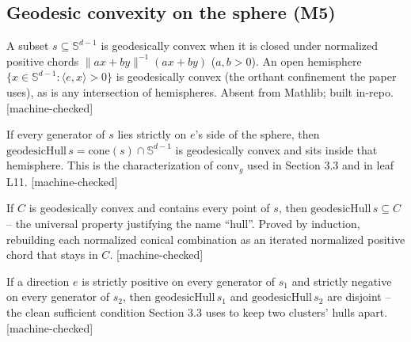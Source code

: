 \subsection{Geodesic convexity on the sphere (M5)}

\begin{lemma}\label{found:gconvex}\leanok
A subset $s \subseteq \mathbb S^{d-1}$ is geodesically convex when it is closed under normalized
positive chords $\|a x + b y\|^{-1}(a x + b y)$ ($a,b>0$). An open hemisphere
$\{x \in \mathbb S^{d-1} : \langle e,x\rangle > 0\}$ is geodesically convex (the orthant confinement
the paper uses), as is any intersection of hemispheres. Absent from Mathlib; built in-repo.
[machine-checked]
\end{lemma}

\begin{lemma}\label{found:ghull}\leanok
If every generator of $s$ lies strictly on $e$'s side of the sphere, then
$\mathrm{geodesicHull}\,s = \mathrm{cone}(s)\cap\mathbb S^{d-1}$ is geodesically convex and sits inside
that hemisphere. This is the characterization of $\mathrm{conv}_g$ used in Section 3.3 and in leaf
L11. [machine-checked]
\end{lemma}

\begin{lemma}\label{found:ghullmin}\leanok
If $C$ is geodesically convex and contains every point of $s$, then
$\mathrm{geodesicHull}\,s \subseteq C$ -- the universal property justifying the name ``hull''. Proved by
induction, rebuilding each normalized conical combination as an iterated normalized positive chord that
stays in $C$. [machine-checked]
\end{lemma}

\begin{lemma}\label{found:ghulldisj}\leanok
If a direction $e$ is strictly positive on every generator of $s_1$ and strictly negative on every
generator of $s_2$, then $\mathrm{geodesicHull}\,s_1$ and $\mathrm{geodesicHull}\,s_2$ are disjoint --
the clean sufficient condition Section 3.3 uses to keep two clusters' hulls apart. [machine-checked]
\end{lemma}


